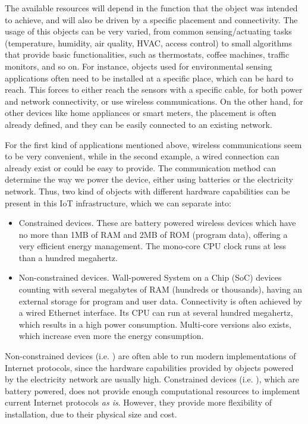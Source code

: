 The available resources will depend in the function that the object was intended to achieve, and will also be driven by a specific placement and connectivity.
The usage of this objects can be very varied, from common sensing/actuating tasks (temperature, humidity, air quality, HVAC, access control) to small algorithms that provide basic functionalities, such as thermostats, coffee machines, traffic monitors, and so on.
For instance, objects used for environmental sensing applications often need to be installed at a specific place\cite{younis2008placement}, which can be hard to reach. 
This forces to either reach the sensors with a specific cable, for both power and network connectivity, or use wireless communications.
On the other hand, for other devices like home appliances or smart meters, the placement is often already defined, and they can be easily connected to an existing network.

For the first kind of applications mentioned above, wireless communications seem to be very convenient, while in the second example, a wired connection can already exist or could be easy to provide.
The communication method can determine the way we power the device, either using batteries or the electricity network.
Thus, two kind of objects with different hardware capabilities can be present in this IoT infrastructure, which we can separate into:

\begin{itemize}
	\item Constrained devices. These are battery powered wireless devices which have no more than 1MB of RAM and 2MB of ROM (program data), offering a very efficient energy management. The mono-core CPU clock runs at less than a hundred megahertz.
	\item Non-constrained devices. Wall-powered System on a Chip (SoC) devices counting with several megabytes of RAM (hundreds or thousands), having an external storage for program and user data. Connectivity is often achieved by a wired Ethernet interface. Its CPU can run at several hundred megahertz, which results in a high power consumption. Multi-core versions also exists, which increase even more the energy consumption.
\end{itemize}

Non-constrained devices (i.e. \cite{RPi}) are often able to run modern implementations of Internet protocols, since the hardware capabilities provided by objects powered by the electricity network are usually high.
Constrained devices (i.e. \cite{iotlab-m3}), which are battery powered, does not provide enough computational resources to implement current Internet protocols \textit{as is}.
However, they provide more flexibility of installation, due to their physical size and cost.


